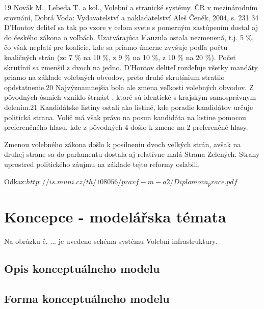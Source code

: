 \documentclass[12pt,a4paper,titlepage,final]{article}
\begin{document}
19
 Novák M., Lebeda T. a kol., Volební a stranické systémy. ČR v mezinárodním srovnání, 
Dobrá Voda: Vydavatelství a nakladatelství Aleš Čeněk, 2004, s. 231 
  34
D'Hontov deliteľ sa tak po vzore v celom svete s pomerným zastúpením 
dostal aj do českého zákona o voľbách. Uzatvárajúca klauzula ostala 
nezmenená, t.j. 5 \%, čo však neplatí pre koalície, kde sa priamo úmerne 
zvyšuje podľa počtu koaličných strán (zo 7 \% na 10 \%, z 9 \% na 10 \%, z 10 
\% na 20 \%). Počet skrutínií sa zmenšil z dvoch na jedno. D'Hontov deliteľ 
rozdeľuje všetky mandáty priamo na základe volebných obvodov, preto 
druhé skrutínium stratilo opdstatnenie.20
 Najvýznamnejšia bola ale zmena 
veľkosti volebných obvodov. Z pôvodných ôsmich vzniklo štrnásť , ktoré sú 
identické s krajským samosprávnym delením.21
 Kandidátske listiny ostali 
ako listiné, kde poradie kandidátov určuje politická strana. Volič má však 
právo na posun kandidáta na listine pomocou preferenčného hlasu, kde 
z pôvodných 4 došlo k zmene na 2 preferenčné hlasy. 
 
Zmenou volebného zákona došlo k posílneniu dvoch veľkých strán, 
avšak na druhej strane sa do parlamentu dostala aj relatívne malá Strana 
Zelených. Strany uprostred politického záujmu na základe tejto reformy 
oslabili. 

Odkaz:$http://is.muni.cz/th/108056/pravf-m-a2/Diplomova_prace.pdf$





\section{Koncepce - modelářska témata}
Na obrázku č. ... je uvedeno schéma systému Volební infrastruktury. 


\subsection{Opis konceptuálneho modelu}
 

\subsection{Forma konceptuálneho modelu}
\end{document}
